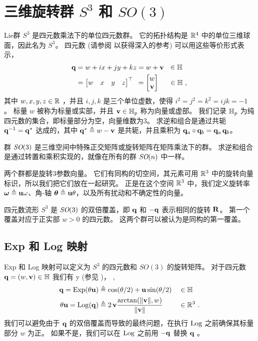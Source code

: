 
\section{三维旋转群 $S^3$ 和 $SO(3)$}
\label{sec:S3_SO3}

Lie群 $S^3$ 是四元数乘法下的单位四元数群。
它的拓扑结构是 ${\mathbb R}^4$ 中的单位三维球面，因此名为 $S^3$。
四元数 (请参阅 \cite{SOLA-17-Quaternion} 以获得深入的参考) 可以用这些等价形式表示，
%
\begin{align}
\begin{split}		
{\bf q} 
&= w+ix+jy+kz
=w+{\bf v} ~~ \in{\mathbb H}
\\
&
=\begin{bmatrix}w&x&y&z\end{bmatrix}^{\top} 
~\,=\begin{bmatrix}w\\{\bf v}\end{bmatrix} \quad~\, \in{\mathbb H}
~,
\end{split}
\end{align}
%
其中 $w,x,y,z\in{\mathbb R}$ ，并且 $i,j,k$ 是三个单位虚数，使得 $i^2=j^2=k^2=ijk=-1$ 。
标量 $w$ 被称为标量或实部，并且 ${\bf v}\in{\mathbb H}_p$ 称为向量或虚部。
我们记录 ${\mathbb H}_p$ 为纯四元数的集合，即标量部分为空，向量维数为3。
求逆和组合是通过共轭 ${\bf q}^{-1} = {\bf q}^*$ 达成的，其中 ${\bf q}^*\triangleq w-{\bf v}$ 是共轭，并且乘积为 ${\bf q}_a\circ{\bf q}_b = {\bf q}_a\,{\bf q}_b$。

群 $\textit{SO}(3)$ 是三维空间中特殊正交矩阵或旋转矩阵在矩阵乘法下的群。
求逆和组合是通过转置和乘积实现的，就像在所有的群 $\textit{SO}(n)$ 中一样。

两个群都是旋转$3$参数向量。 
它们有同构的切空间，其元素可用 ${\mathbb R}^3$ 中的旋转向量标识，所以我们把它们放在一起研究。
正是在这个空间 ${\mathbb R}^3$ 中，我们定义旋转率  ${{\bm \omega}}\triangleq{\bf u}\omega$、角-轴 ${{\bm \theta}}\triangleq{\bf u}\theta$，以及所有扰动和不确定性的向量。

四元数流形 $S^3$ 是 $\textit{SO}(3)$ 的双倍覆盖，即 ${\bf q}$ 和 $-{\bf q}$ 表示相同的旋转 ${\bf R}$。
第一个覆盖对应于正实部 $w>0$ 的四元数。
这两个群可以被认为是同构的第一覆盖。




\subsection{Exp 和 Log 映射}

Exp 和 Log 映射可以定义为 $S^3$ 的四元数和 $SO(3)$ 的旋转矩阵。
对于四元数 ${\bf q}=(w,{\bf v})\in{\mathbb H}$ 我们有%
%
\if \examples y (参见 )， \else, \fi
%
%
\begin{align}
{\bf q}= \operatorname*{Exp}(\theta{\bf u}) &\triangleq \cos(\theta/2) + {\bf u}\sin(\theta/2) &&\in{\mathbb H}\\ 
\theta{\bf u} = \operatorname*{Log}({\bf q}) &\triangleq 2\,{\bf v}\frac{\arctan({{\left\|{\bf v}\right\|},w})}{{\left\|{\bf v}\right\|}}&&\in{\mathbb R}^3
~.
\end{align}
%
我们可以避免由于 ${\bf q}$ 的双倍覆盖而导致的最终问题，在执行 $\operatorname*{Log}$ 之前确保其标量部分 $w$ 为正。
如果不是，我们可以在 $\operatorname*{Log}$ 之前用 $-{\bf q}$ 替换 ${\bf q}$ 。

